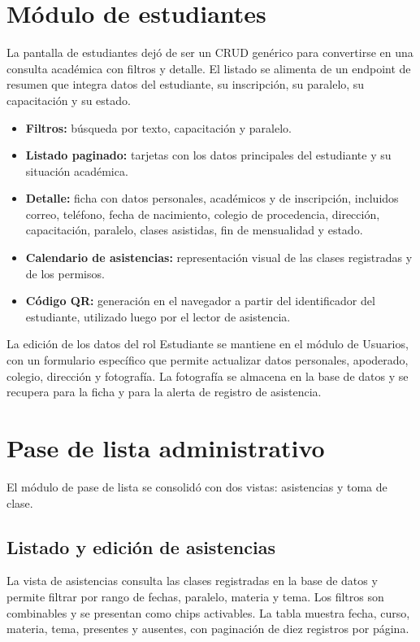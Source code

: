 \documentclass[12pt,a4paper,oneside]{report}
\begin{document}
\section{Módulo de estudiantes}

La pantalla de estudiantes dejó de ser un CRUD genérico para convertirse en una consulta académica con filtros y detalle. El listado se alimenta de un endpoint de resumen que integra datos del estudiante, su inscripción, su paralelo, su capacitación y su estado.

\begin{itemize}[leftmargin=1.5em]
  \item \textbf{Filtros:} búsqueda por texto, capacitación y paralelo.
  \item \textbf{Listado paginado:} tarjetas con los datos principales del estudiante y su situación académica.
  \item \textbf{Detalle:} ficha con datos personales, académicos y de inscripción, incluidos correo, teléfono, fecha de nacimiento, colegio de procedencia, dirección, capacitación, paralelo, clases asistidas, fin de mensualidad y estado.
  \item \textbf{Calendario de asistencias:} representación visual de las clases registradas y de los permisos.
  \item \textbf{Código QR:} generación en el navegador a partir del identificador del estudiante, utilizado luego por el lector de asistencia.
\end{itemize}

La edición de los datos del rol Estudiante se mantiene en el módulo de Usuarios, con un formulario específico que permite actualizar datos personales, apoderado, colegio, dirección y fotografía. La fotografía se almacena en la base de datos y se recupera para la ficha y para la alerta de registro de asistencia.

\section{Pase de lista administrativo}

El módulo de pase de lista se consolidó con dos vistas: asistencias y toma de clase.

\subsection{Listado y edición de asistencias}

La vista de asistencias consulta las clases registradas en la base de datos y permite filtrar por rango de fechas, paralelo, materia y tema. Los filtros son combinables y se presentan como chips activables. La tabla muestra fecha, curso, materia, tema, presentes y ausentes, con paginación de diez registros por página.
\end{document}
